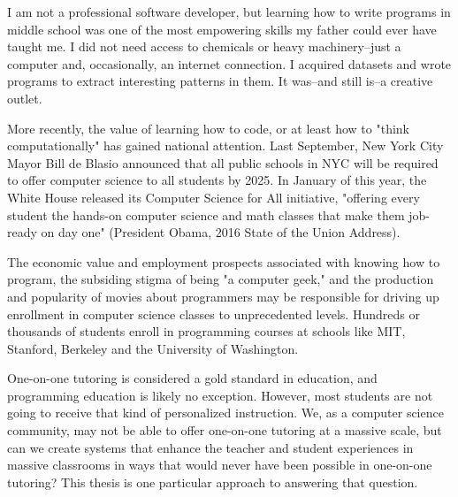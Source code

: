 I am not a professional software developer, but learning how to write programs in middle school was one of the most empowering skills my father could ever have taught me. I did not need access to chemicals or heavy machinery--just a computer and, occasionally, an internet connection. I acquired datasets and wrote programs to extract interesting patterns in them. It was--and still is--a creative outlet.

More recently, the value of learning how to code, or at least how to "think computationally" has gained national attention. Last September, New York City Mayor Bill de Blasio announced that all public schools in NYC will be required to offer computer science to all students by 2025. In January of this year, the White House released its Computer Science for All initiative, "offering every student the hands-on computer science and math classes that make them job-ready on day one" (President Obama, 2016 State of the Union Address).

The economic value and employment prospects associated with knowing how to program, the subsiding stigma of being "a computer geek," and the production and popularity of movies about programmers may be responsible for driving up enrollment in computer science classes to unprecedented levels. Hundreds or thousands of students enroll in programming courses at schools like MIT, Stanford, Berkeley and the University of Washington.

One-on-one tutoring is considered a gold standard in education, and programming education is likely no exception. However, most students are not going to receive that kind of personalized instruction. We, as a computer science community, may not be able to offer one-on-one tutoring at a massive scale, but can we create systems that enhance the teacher and student experiences in massive classrooms in ways that would never have been possible in one-on-one tutoring? This thesis is one particular approach to answering that question. %

